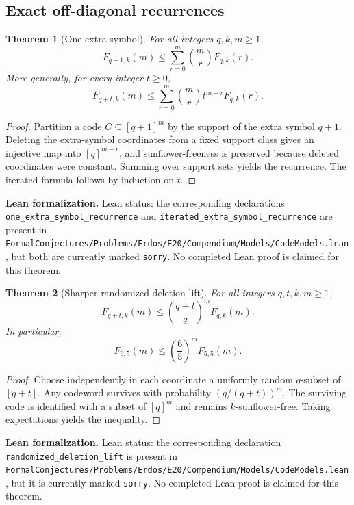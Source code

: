 \documentclass[11pt]{article}
\newtheorem{theorem}{Theorem}[section]
\theoremstyle{definition}
\newcommand{\1}{\mathbf{1}}
\newcommand{\leannote}[1]{\par\smallskip\noindent\textbf{Lean formalization.} #1\par\smallskip}
\begin{document}
\subsection{Exact off-diagonal recurrences}
\begin{theorem}[One extra symbol]\label{thm:extra-symbol}
For all integers $q,k,m\ge 1$,
\[
F_{q+1,k}(m)\le \sum_{r=0}^m \binom{m}{r}F_{q,k}(r).
\]
More generally, for every integer $t\ge 0$,
\[
F_{q+t,k}(m)\le \sum_{r=0}^m \binom{m}{r} t^{m-r}F_{q,k}(r).
\]
\end{theorem}

\begin{proof}
Partition a code $C\subseteq [q+1]^m$ by the support of the extra symbol $q+1$. Deleting the extra-symbol coordinates from a fixed support class gives an injective map into $[q]^{m-r}$, and sunflower-freeness is preserved because deleted coordinates were constant. Summing over support sets yields the recurrence. The iterated formula follows by induction on $t$.
\end{proof}

\leannote{Lean status: the corresponding declarations \texttt{one\_extra\_symbol\_recurrence} and \texttt{iterated\_extra\_symbol\_recurrence} are present in \texttt{FormalConjectures/Problems/Erdos/E20/Compendium/Models/CodeModels.lean}, but both are currently marked \texttt{sorry}. No completed Lean proof is claimed for this theorem.}

\begin{theorem}[Sharper randomized deletion lift]\label{thm:randomized-deletion}
For all integers $q,t,k,m\ge 1$,
\[
F_{q+t,k}(m)\le \left(\frac{q+t}{q}\right)^m F_{q,k}(m).
\]
In particular,
\[
F_{6,5}(m)\le \left(\frac65\right)^m F_{5,5}(m).
\]
\end{theorem}

\begin{proof}
Choose independently in each coordinate a uniformly random $q$-subset of $[q+t]$. Any codeword survives with probability $(q/(q+t))^m$. The surviving code is identified with a subset of $[q]^m$ and remains $k$-sunflower-free. Taking expectations yields the inequality.
\end{proof}

\leannote{Lean status: the corresponding declaration \texttt{randomized\_deletion\_lift} is present in \texttt{FormalConjectures/Problems/Erdos/E20/Compendium/Models/CodeModels.lean}, but it is currently marked \texttt{sorry}. No completed Lean proof is claimed for this theorem.}
\end{document}
